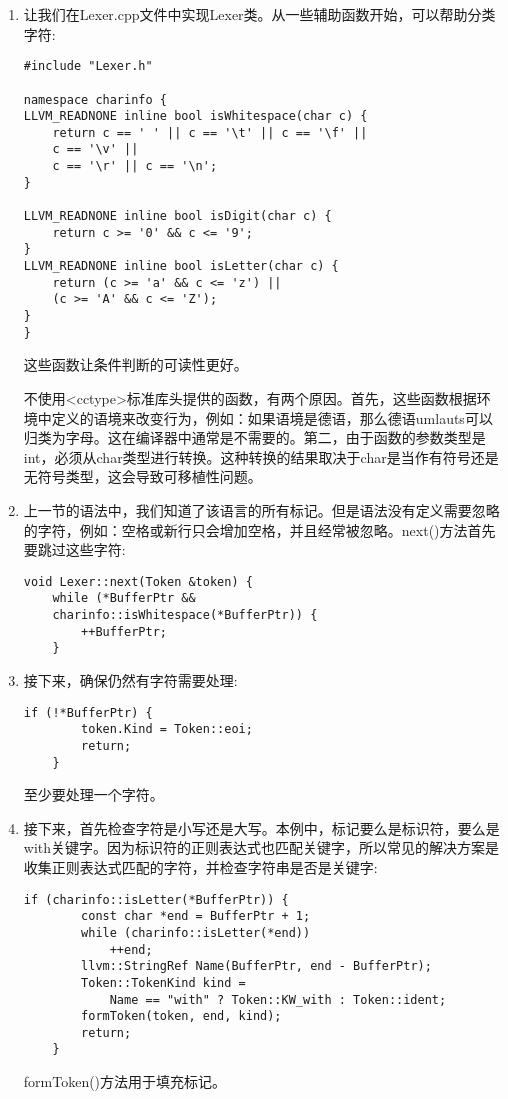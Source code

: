 \begin{enumerate}
\item 让我们在Lexer.cpp文件中实现Lexer类。从一些辅助函数开始，可以帮助分类字符:
\begin{lstlisting}[caption={}]
#include "Lexer.h"

namespace charinfo {
LLVM_READNONE inline bool isWhitespace(char c) {
	return c == ' ' || c == '\t' || c == '\f' ||
	c == '\v' ||
	c == '\r' || c == '\n';
}

LLVM_READNONE inline bool isDigit(char c) {
	return c >= '0' && c <= '9';
}
LLVM_READNONE inline bool isLetter(char c) {
	return (c >= 'a' && c <= 'z') ||
	(c >= 'A' && c <= 'Z');
}
}
\end{lstlisting}
这些函数让条件判断的可读性更好。
\begin{tcolorbox}[colback=blue!5!white,colframe=blue!75!black,title=Note]
不使用<cctype>标准库头提供的函数，有两个原因。首先，这些函数根据环境中定义的语境来改变行为，例如：如果语境是德语，那么德语umlauts可以归类为字母。这在编译器中通常是不需要的。第二，由于函数的参数类型是int，必须从char类型进行转换。这种转换的结果取决于char是当作有符号还是无符号类型，这会导致可移植性问题。
\end{tcolorbox}

\item 上一节的语法中，我们知道了该语言的所有标记。但是语法没有定义需要忽略的字符，例如：空格或新行只会增加空格，并且经常被忽略。next()方法首先要跳过这些字符:
\begin{lstlisting}[caption={}]
void Lexer::next(Token &token) {
	while (*BufferPtr &&
	charinfo::isWhitespace(*BufferPtr)) {
		++BufferPtr;
	}
\end{lstlisting}

\item 接下来，确保仍然有字符需要处理:
\begin{lstlisting}[caption={}]
	if (!*BufferPtr) {
		token.Kind = Token::eoi;
		return;
	}
\end{lstlisting}
至少要处理一个字符。
	
\item 接下来，首先检查字符是小写还是大写。本例中，标记要么是标识符，要么是with关键字。因为标识符的正则表达式也匹配关键字，所以常见的解决方案是收集正则表达式匹配的字符，并检查字符串是否是关键字:
\begin{lstlisting}[caption={}]
	if (charinfo::isLetter(*BufferPtr)) {
		const char *end = BufferPtr + 1;
		while (charinfo::isLetter(*end))
			++end;
		llvm::StringRef Name(BufferPtr, end - BufferPtr);
		Token::TokenKind kind =
			Name == "with" ? Token::KW_with : Token::ident;
		formToken(token, end, kind);
		return;
	}
\end{lstlisting}
formToken()方法用于填充标记。


\end{enumerate}
